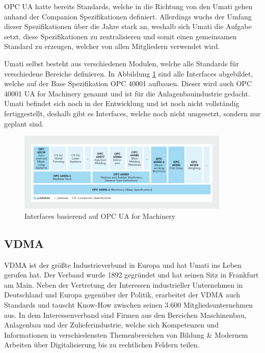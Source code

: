 \documentclass[a4paper, 12pt, oneside]{scrbook}
\begin{document}
		
		OPC UA hatte bereits Standards, welche in die Richtung von den Umati gehen anhand der Companion Spezifikationen definiert. Allerdings wuchs der Umfang dieser Spezifikationen über die Jahre stark an, weshalb sich Umati die Aufgabe setzt, diese Spezifikationen zu zentralisieren und somit einen gemeinsamen Standard zu erzeugen, welcher von allen Mitgliedern verwendet wird.
		
		Umati selbst besteht aus verschiedenen Modulen, welche alle Standards für verschiedene Bereiche definieren. In Abbildung \ref{fig:OPCUA_for_machinery} sind alle Interfaces abgebildet, welche auf der Base Spezifikation OPC 40001 aufbauen. Dieser wird auch OPC 40001 UA for Machinery genannt und ist für die Anlagenbauindustrie gedacht. Umati befindet sich noch in der Entwicklung und ist noch nicht vollständig fertiggestellt, deshalb gibt es Interfaces, welche noch nicht umgesetzt, sondern nur geplant sind. \cite{noauthor_machinery_nodate}
		
		\begin{figure}[H]
			\centering
			\includegraphics[width=0.9\textwidth]{res/diagramms/OPCUA_for_machinery.png}
			\caption{Interfaces basierend auf OPC UA for Machinery \cite{noauthor_machinery_nodate}} 
			\label{fig:OPCUA_for_machinery}
		\end{figure}
		
		
		\subsection{VDMA}
		
		\ac{VDMA} ist der größte Industrieverbund in Europa und hat Umati ins Leben gerufen hat. Der Verband wurde 1892 gegründet und hat seinen Sitz in Frankfurt am Main. Neben der Vertretung der Interessen industrieller Unternehmen in Deutschland und Europa gegenüber der Politik, erarbeitet der VDMA auch Standards und tauscht Know-How zwischen seinen 3.600 Mitgliedsunternehmen aus. \cite{noauthor_verband_nodate} In dem Interessenverband sind Firmen aus den Bereichen Maschinenbau, Anlagenbau und der Zulieferindustrie, welche sich Kompetenzen und Informationen in verschiedensten Themenbereichen von Bildung \& Modernem Arbeiten über Digitalisierung bis zu rechtlichen Feldern teilen. \cite{noauthor_themenubersicht_nodate}
		
\end{document}
